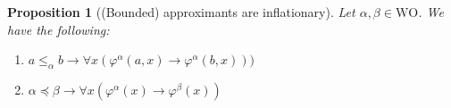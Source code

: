 \documentclass[10pt,a4paper]{amsart}
\theoremstyle{plain}
\newtheorem{proposition}[proposition]{Proposition}
\theoremstyle{definition}
\renewcommand{\phi}{\varphi}
\theoremstyle{plain}
\theoremstyle{definition} %
\newcommand{\limp}{\to}
\newcommand{\Sin}[2]{\Sigma^{#1}_{#2}}
\newcommand{\Pin}[2]{\Pi^{#1}_{#2}}
\newcommand{\posSin}[3]{\Sin{#1,+}{#2} (#3)}
\newcommand{\posnegSin}[4]{\posSin{#1}{#2}{#3, \lnot #4}}
\newcommand{\CA}{\mathsf{CA}}
\newcommand{\ca}[1]{#1\text{-}\CA}
\newcommand{\PSCA}{\ca{\Pin 1 2 }_0}
\newcommand{\WO}{\mathrm{WO}}
\newcommand{\ordleq}{\preceq}
\begin{document}
\begin{proposition}
    [(Bounded) approximants are inflationary]
\label{prop:approximants-are-inflationary}
Let $\alpha,\beta \in \WO$. We have the following:
\begin{enumerate}
    \item\label{item:bdd-approximants-are-inflationary} $a\leq_\alpha b \limp \forall x (\phi^\alpha(a,x) \limp \phi^\alpha(b,x)) )$
    \item\label{item:approximants-are-inflationary} $\alpha \ordleq \beta \limp \forall x (\phi^\alpha(x) \limp \phi^\beta(x))$
\end{enumerate}
\end{proposition}
\end{document}
